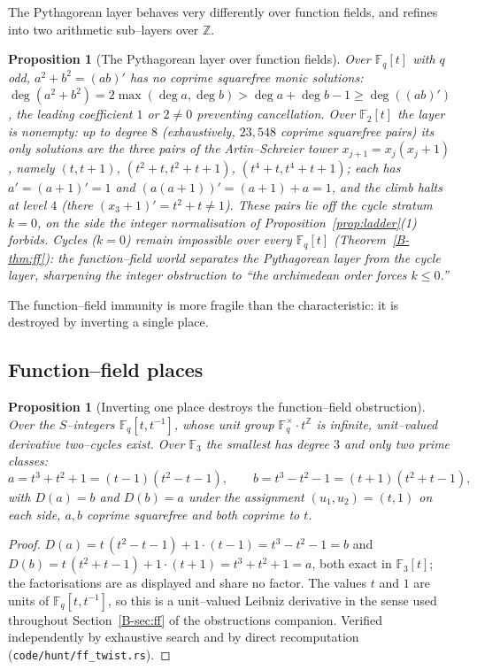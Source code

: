 \documentclass[11pt]{article}
\newtheorem{proposition}[theorem]{Proposition}
\theoremstyle{definition}
\begin{document}
The Pythagorean layer behaves very differently over function fields, and refines into two arithmetic
sub--layers over $\mathbb{Z}$.

\begin{proposition}[The Pythagorean layer over function fields]\label{prop:ff-pyth}
Over $\mathbb{F}_q[t]$ with $q$ odd, $a^2+b^2=(ab)'$ has no coprime squarefree monic solutions:
$\deg(a^2+b^2)=2\max(\deg a,\deg b)>\deg a+\deg b-1\ge\deg((ab)')$, the leading coefficient $1$ or
$2\ne0$ preventing cancellation. Over $\mathbb{F}_2[t]$ the layer is nonempty: up to degree $8$
(exhaustively, $23{,}548$ coprime squarefree pairs) its only solutions are the three pairs of the
Artin--Schreier tower $x_{j+1}=x_j(x_j+1)$, namely $(t,t+1)$, $(t^2+t,t^2+t+1)$, $(t^4+t,t^4+t+1)$;
each has $a'=(a+1)'=1$ and $(a(a+1))'=(a+1)+a=1$, and the climb halts at level $4$ (there
$(x_3+1)'=t^2+t\ne1$). These pairs lie off the cycle stratum $k=0$, on the side the integer
normalisation of Proposition~\ref{prop:ladder}(1) forbids. Cycles ($k=0$) remain impossible over every
$\mathbb{F}_q[t]$ (Theorem~\ref{B-thm:ff}): the function--field world separates the Pythagorean layer
from the cycle layer, sharpening the integer obstruction to ``the archimedean order forces $k\le0$.''
\end{proposition}

The function--field immunity is more fragile than the characteristic: it is destroyed by inverting
a single place.

\subsection{Function--field places}\label{ssec:ffplaces}

\begin{proposition}[Inverting one place destroys the function--field obstruction]\label{prop:ffsunit}
Over the $S$--integers $\mathbb{F}_q[t,t^{-1}]$, whose unit group $\mathbb{F}_q^\times\cdot t^{\mathbb{Z}}$
is infinite, unit--valued derivative two--cycles exist. Over $\mathbb{F}_3$ the smallest has degree
$3$ and only \emph{two} prime classes:
\[ a=t^3+t^2+1=(t-1)(t^2-t-1),\qquad b=t^3-t^2-1=(t+1)(t^2+t-1), \]
with $D(a)=b$ and $D(b)=a$ under the assignment $(u_1,u_2)=(t,1)$ on each side, $a,b$ coprime
squarefree and both coprime to $t$.
\end{proposition}
\begin{proof}
$D(a)=t\,(t^2-t-1)+1\cdot(t-1)=t^3-t^2-1=b$ and $D(b)=t\,(t^2+t-1)+1\cdot(t+1)=t^3+t^2+1=a$, both
exact in $\mathbb{F}_3[t]$; the factorisations are as displayed and share no factor. The values
$t$ and $1$ are units of $\mathbb{F}_q[t,t^{-1}]$, so this is a unit--valued Leibniz derivative in
the sense used throughout Section~\ref{B-sec:ff} of the obstructions companion. Verified independently by exhaustive search and by
direct recomputation (\texttt{code/hunt/ff\_twist.rs}).
\end{proof}
\end{document}
